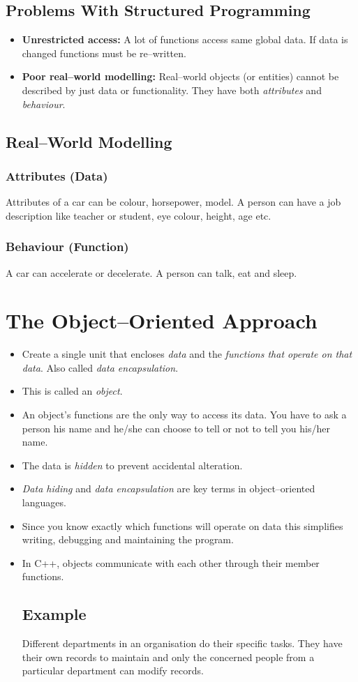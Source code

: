 \documentclass[12pt,a4paper]{article}
\begin{document}
\subsection{Problems With Structured Programming}
\begin{itemize}
\item \textbf{Unrestricted access:} A lot of functions access same global data. If data is changed functions must be re--written.
\item \textbf{Poor real--world modelling:} Real--world objects (or entities) cannot be described by just data or functionality. They have both \textit{attributes} and \textit{behaviour}.
\end{itemize}
\subsection{Real--World Modelling}
\subsubsection{Attributes (Data)}
Attributes of a car can be colour, horsepower, model. A person can have a job description like teacher or student, eye colour, height, age etc.
\subsubsection{Behaviour (Function)}
A car can accelerate or decelerate. A person can talk, eat and sleep.
\section{The Object--Oriented Approach}
\begin{itemize}
\item Create a single unit that encloses \textit{data} and the \textit{functions that operate on that data}. Also called \textit{data encapsulation}.
\item This is called an \textit{object}.
\item An object's functions are the only way to access its data. You have to ask a person his name and he/she can choose to tell or not to tell you his/her name.
\item The data is \textit{hidden} to prevent accidental alteration.
\item \textit{Data hiding} and \textit{data encapsulation} are key terms in object--oriented languages.
\item Since you know exactly which functions will operate on data this simplifies writing, debugging and maintaining the program.
\item In C++, objects communicate with each other through their member functions.
\subsection{Example}
Different departments in an organisation do their specific tasks. They have their own records to maintain and only the concerned people from a particular department can modify records.
\end{itemize}
\end{document}
